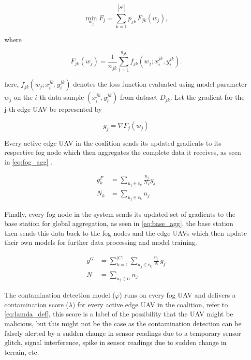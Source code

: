 \documentclass[10pt,journal,compsoc]{IEEEtran}
\begin{document}
\begin{equation}
\min_{w_j} F_j = \sum_{k=1}^{|S^j|} p_{jk} \, F_{jk}(w_j),
\end{equation}

where

\begin{equation}
F_{jk}(w_j)
=
\frac{1}{n_{jk}}
\sum_{i=1}^{n_{jk}}
f_{jk}(w_j; x_i^{jk}, y_i^{jk}).
\end{equation}

here, $f_{jk}(w_j; x_i^{jk}, y_i^{jk})$ denotes the loss function evaluated using model parameter $w_j$ on the $i$-th data sample $(x_i^{jk}, y_i^{jk})$ from dataset $D_{jk}$. Let the gradient for the j-th edge UAV be represented by

\begin{equation}\label{eq:edge_grad}
g_j = \nabla F_j(w_j)
\end{equation}

Every active edge UAV in the coalition sends its updated gradients to its respective fog node which then aggregates the complete data it receives, as seen in \eqref{eq:fog_agg} \cite{fedavg}. 

\begin{subequations}\label{eq:fog_agg}
\begin{align}
g_k^F &= \sum_{u_j \in c_k} \frac{n_j}{N_k} g_j \\
N_k &= \sum_{u_j \in c_k} n_j
\end{align}
\end{subequations}

Finally, every fog node in the system sends its updated set of gradients to the base station for global aggregation, as seen in \eqref{eq:base_agg}, the base station then sends this data back to the fog nodes and the edge UAVs which then update their own models for further data processing and model training.

\begin{subequations}\label{eq:base_agg}
\begin{align}
g^G &=
\sum_{k=1}^{|C|}
\sum_{u_j \in c_k}
\frac{n_j}{N} \, g_j \\
N &=
\sum_{u_j \in U} n_j
\end{align}
\end{subequations}

The contamination detection model ($\varphi$) runs on every fog UAV and delivers a contamination score ($\lambda$) for every active edge UAV in the coalition, refer to \eqref{eq:lamda_def}, this score is a label of the possibility that the UAV might be malicious, but this might not be the case as the contamination detection can be falsely alerted by a sudden change in sensor readings due to a temporary sensor glitch, signal interference, spike in sensor readings due to sudden change in terrain, etc. 
\end{document}
